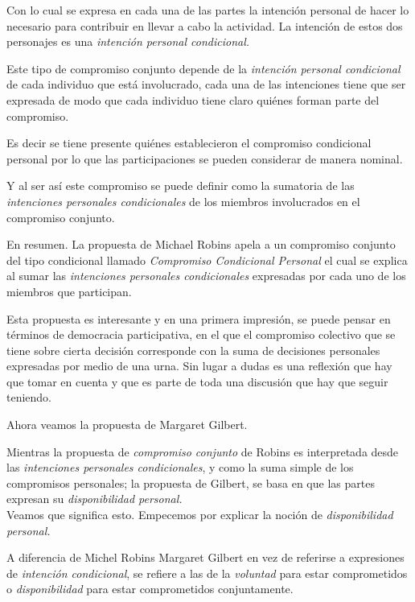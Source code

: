 \documentclass[oneside]{book}
\begin{document}
Con lo cual se expresa en cada una de las partes la intención personal de hacer lo necesario para contribuir en llevar a cabo la actividad. La intención de estos dos personajes es una \textit{intención personal condicional.}

Este tipo de compromiso conjunto depende de la \textit{intención personal condicional} de cada individuo que está involucrado, cada una de las intenciones tiene que ser expresada de modo que cada individuo tiene claro quiénes forman parte del compromiso.

Es decir se tiene presente quiénes establecieron el compromiso condicional personal por lo que las participaciones se pueden considerar de manera nominal.

Y al ser así este compromiso se puede definir como la sumatoria de las \textit{intenciones personales condicionales} de los miembros involucrados en el compromiso conjunto.

En resumen. La propuesta de Michael Robins apela a un compromiso conjunto del tipo condicional llamado \textit{Compromiso Condicional Personal} el cual se explica al sumar las \textit{intenciones personales condicionales} expresadas por cada uno de los miembros que participan.

Esta propuesta es interesante y en una primera impresión, se puede pensar en términos de democracia participativa, en el que el compromiso colectivo que se tiene sobre cierta decisión corresponde con la suma de decisiones personales expresadas por medio de una urna. Sin lugar a dudas es una reflexión que hay que tomar en cuenta y que es parte de toda una discusión que hay que seguir teniendo.

Ahora veamos la propuesta de Margaret Gilbert.

Mientras la propuesta de \textit{compromiso conjunto} de Robins es interpretada desde las \textit{intenciones personales condicionales}, y como la suma simple de los compromisos personales; la propuesta de Gilbert, se basa en que las partes expresan su \textit{disponibilidad personal.}
\\

Veamos que significa esto. Empecemos por explicar la noción de \textit{disponibilidad personal.}

A diferencia de Michel Robins Margaret Gilbert en vez de referirse a expresiones de \textit{intención condicional}, se refiere a las de la \textit{voluntad} para estar comprometidos o \textit{disponibilidad} para estar comprometidos conjuntamente.
\end{document}
